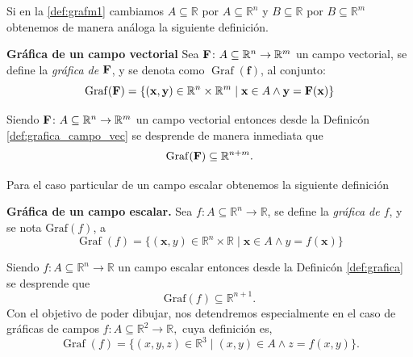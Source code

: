  Si en la \autoref{def:grafm1} cambiamos  $A \subseteq \mathbb{R}$ por $A \subseteq \mathbb{R}^{n}$  y  $B \subseteq \mathbb{R}$ por $B \subseteq \mathbb{R}^{m}$ obtenemos de manera an\'aloga la siguiente definici\'on.    


\begin{definition}\textbf{Gráfica de un campo vectorial}
\label{def:grafica_campo_vec}
Sea $\campoVec{F} \colon A \subseteq \mathbb{R}^n \to \mathbb{R}^m$ un campo vectorial,  se define la \textit{gráfica de $\campoVec{F}$}, y se denota como $\operatorname{Graf}(\mathbf{f})$, al conjunto:
\[ 
\operatorname{Graf}(\campoVec{F}) = \{ (\mathbf{x}, \mathbf{y}) \in \mathbb{R}^{n} \times \mathbb{R}^{m} \mid \mathbf{x} \in A \land \mathbf{y} = \campoVec{F}(\mathbf{x}) \} 
\]
\end{definition}

\begin{obs} Siendo $\campoVec{F} \colon A \subseteq \mathbb{R}^n \to \mathbb{R}^m$ un campo vectorial entonces  desde la Definicón \ref{def:grafica_campo_vec} se desprende de manera inmediata que 
 \[
\operatorname{Graf}(\campoVec{F})   \subseteq  \mathbb{R}^{n+m}.
 \]
\end{obs}
Para el caso particular de un campo escalar obtenemos la siguiente definición
\begin{definition}\textbf{Gráfica de un campo escalar.} 
 \label{def:grafica}
 Sea \( f: A  \subseteq  \mathbb{R}^n \to  \mathbb{R}\),  se define la \textit{gráfica de $f$}, y se nota $\text{Graf}(f)$,  a
 \[
\operatorname{Graf}(f)=\{(\mathbf{x}, y) \in  \mathbb{R}^{n} \times \mathbb{R}  \;|\; \mathbf{x} \in A \land  y = f(\mathbf{x}) \}
 \]
\end{definition}


\begin{obs}  Siendo \( f: A  \subseteq  \mathbb{R}^n \to  \mathbb{R}\) un campo escalar   entonces  desde la Definicón \ref{def:grafica}  se desprende que  $$\text{Graf}(f) \subseteq  \mathbb{R}^{n+1}.$$  Con el objetivo de poder dibujar,  nos detendremos especialmente en el caso de gr\'aficas de  campos  $f: A\subseteq \mathbb{R}^2 \rightarrow \mathbb{R},$ cuya definici\'on es,  
 \[
\operatorname{Graf}(f)=\{(x,y,z)\in \mathbb{R}^3 \;|\;(x,y)\in A \land z=f(x,y) \}.
 \]
\end{obs}

 




